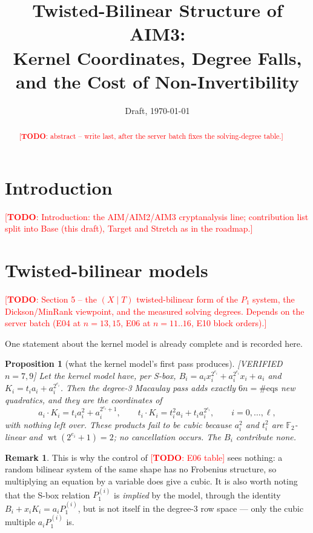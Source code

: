 \documentclass[11pt]{article}
\title{Twisted-Bilinear Structure of AIM3:\\ Kernel Coordinates, Degree Falls, and the Cost of Non-Invertibility}
\author{\todo{authors}}
\date{Draft, \today}
\newcommand{\todo}[1]{\textcolor{red}{[\textbf{TODO}: #1]}}
\newcommand{\Verified}[1]{\textsf{[VERIFIED #1]}}
\newcommand{\F}{\mathbb{F}}
\newcommand{\wt}{\operatorname{wt}}
\theoremstyle{plain}
\newtheorem{proposition}[theorem]{Proposition}
\theoremstyle{definition}
\newtheorem{remark}[theorem]{Remark}
\begin{document}
\maketitle

\begin{abstract}
\todo{abstract -- write last, after the server batch fixes the solving-degree table.}
\end{abstract}

\section{Introduction}\label{sec:intro}
\todo{Introduction: the AIM/AIM2/AIM3 cryptanalysis line; contribution list split into
Base (this draft), Target and Stretch as in the roadmap.}





\section{Twisted-bilinear models}\label{sec:models}
\todo{Section 5 -- the $(X\mid T)$ twisted-bilinear form of the $P_1$ system, the
Dickson/MinRank viewpoint, and the measured solving degrees. Depends on the server batch
(E04 at $n=13,15$, E06 at $n=11..16$, E10 block orders).}

One statement about the kernel model is already complete and is recorded here.
\begin{proposition}[what the kernel model's first pass produces]\label{prop:kernel-falls}
\Verified{$n=7,9$} Let the kernel model have, per S-box,
$B_i=a_ix_i^{2^{e_i}}+a_i^{2^{e_i}}x_i+a_i$ and $K_i=t_ia_i+a_i^{2^{e_i}}$. Then the degree-3
Macaulay pass adds exactly $6n=\#\mathrm{eqs}$ new quadratics, and they are the coordinates of
\[
  a_i\cdot K_i=t_ia_i^{2}+a_i^{2^{e_i}+1},\qquad
  t_i\cdot K_i=t_i^{2}a_i+t_ia_i^{2^{e_i}},\qquad i=0,\dots,\ell ,
\]
with nothing left over. These products fail to be cubic because $a_i^2$ and $t_i^2$ are
$\F_2$-linear and $\wt(2^{e_i}+1)=2$; no cancellation occurs. The $B_i$ contribute none.
\end{proposition}
\begin{remark}
This is why the control of \todo{E06 table} sees nothing: a random bilinear system of the same shape
has no Frobenius structure, so multiplying an equation by a variable does give a cubic. It is also
worth noting that the S-box relation $P_1^{(i)}$ is \emph{implied} by the model, through the identity
$B_i+x_iK_i=a_iP_1^{(i)}$, but is not itself in the degree-3 row space --- only the cubic multiple
$a_iP_1^{(i)}$ is.
\end{remark}
\end{document}
